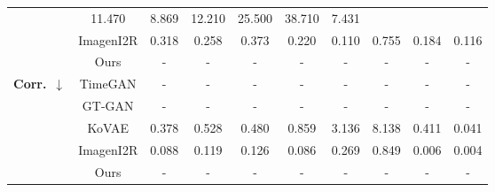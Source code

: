 \documentclass{article}
\theoremstyle{plain}
\theoremstyle{definition}
\theoremstyle{remark}
\begin{document}
\begin{table}[!t]
{\begin{tabular}{cc|cccccccc}
          & 11.470 
          & 8.869 
          & 12.210 
          & 25.500 
          & 38.710 
          & 7.431 \\
      & ImagenI2R  
          & 0.318
          & 0.258
          & 0.373
          & 0.220
          & 0.110
          & 0.755
          & 0.184
          & 0.116 \\
    & Ours
       & - & - & - & - & - & - & - & - \\
    \midrule
    \multirow{5}{*}{\textbf{Corr.}~$\downarrow$}
      & TimeGAN & - & - & - & - & - & - & - & - \\
      & GT-GAN  & - & - & - & - & - & - & - & - \\
      & KoVAE 
          & 0.378 
          & 0.528 
          & 0.480 
          & 0.859 
          & 3.136 
          & 8.138 
          & 0.411 
          & 0.041 \\
      & ImagenI2R  
          & 0.088
          & 0.119
          & 0.126
          & 0.086
          & 0.269
          & 0.849
          & 0.006
          & 0.004 \\
    & Ours
       & - & - & - & - & - & - & - & - \\
    \midrule
    

\end{tabular}}
\end{table}
\end{document}
